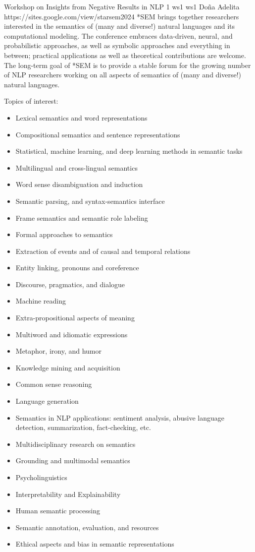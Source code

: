 \begin{wsschedulenolist}
{Workshop on Insights from Negative Results in NLP}
{1}
{ws1}
{ws1}
{Do\~na Adelita}
{https://sites.google.com/view/starsem2024}
    *SEM brings together researchers interested in the semantics of (many and diverse!) natural languages and its computational modeling. The conference embraces data-driven, neural, and probabilistic approaches, as well as symbolic approaches and everything in between; practical applications as well as theoretical contributions are welcome. The long-term goal of *SEM is to provide a stable forum for the growing number of NLP researchers working on all aspects of semantics of (many and diverse!) natural languages.

    Topics of interest:

\begin{itemize}
\item Lexical semantics and word representations
\item Compositional semantics and sentence representations
\item Statistical, machine learning, and deep learning methods in semantic tasks
\item Multilingual and cross-lingual semantics
\item Word sense disambiguation and induction
\item Semantic parsing, and syntax-semantics interface
\item Frame semantics and semantic role labeling
\item Formal approaches to semantics
\item Extraction of events and of causal and temporal relations
\item Entity linking, pronouns and coreference
\item Discourse, pragmatics, and dialogue
\item Machine reading
\item Extra-propositional aspects of meaning
\item Multiword and idiomatic expressions
\item Metaphor, irony, and humor
\item Knowledge mining and acquisition
\item Common sense reasoning
\item Language generation
\item Semantics in NLP applications: sentiment analysis, abusive language detection, summarization, fact-checking, etc.
\item Multidisciplinary research on semantics
\item Grounding and multimodal semantics
\item Psycholinguistics
\item Interpretability and Explainability
\item Human semantic processing
\item Semantic annotation, evaluation, and resources
\item Ethical aspects and bias in semantic representations
\end{itemize}
\end{wsschedulenolist}
